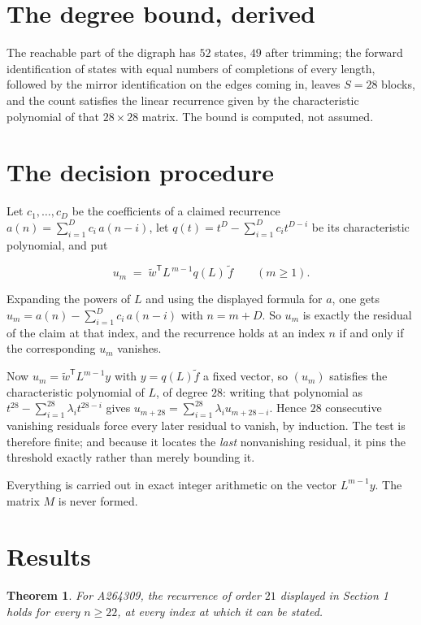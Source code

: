 \documentclass[11pt]{article}
\newtheorem{theorem}{Theorem}
\theoremstyle{definition}
\begin{document}
\section{The degree bound, derived}

The reachable part of the digraph has $52$ states, $49$ after trimming; the forward identification of states with equal numbers of completions of every length, followed by the mirror identification on the edges coming in, leaves $S = 28$ blocks, and the count satisfies the linear recurrence given by the characteristic polynomial of that $28\times28$ matrix. The bound is computed, not assumed.

\section{The decision procedure}

Let $c_1,\dots,c_D$ be the coefficients of a claimed recurrence $a(n) = \sum_{i=1}^{D} c_i\,a(n-i)$, let $q(t) = t^{D} - \sum_{i=1}^{D} c_i t^{D-i}$ be its characteristic polynomial, and put

\[u_m \;=\; \tilde w^{\mathsf T} L^{\,m-1} q(L)\,\tilde f \qquad (m \ge 1).\]

Expanding the powers of $L$ and using the displayed formula for $a$, one gets $u_m = a(n) - \sum_{i=1}^{D} c_i\,a(n-i)$ with $n = m + D$. So $u_m$ is exactly the residual of the claim at that index, and the recurrence holds at an index $n$ if and only if the corresponding $u_m$ vanishes.

Now $u_m = \tilde w^{\mathsf T} L^{m-1} y$ with $y = q(L)\tilde f$ a fixed vector, so $(u_m)$ satisfies the characteristic polynomial of $L$, of degree $28$: writing that polynomial as $t^{28} - \sum_{i=1}^{28} \lambda_i t^{28-i}$ gives $u_{m+28} = \sum_{i=1}^{28} \lambda_i u_{m+28-i}$. Hence $28$ consecutive vanishing residuals force every later residual to vanish, by induction. The test is therefore finite; and because it locates the {\itshape last} nonvanishing residual, it pins the threshold exactly rather than merely bounding it.

Everything is carried out in exact integer arithmetic on the vector $L^{m-1}y$. The matrix $M$ is never formed.

\section{Results}

\begin{theorem} For A264309, the recurrence of order $21$ displayed in Section 1 holds for every $n \ge 22$, at every index at which it can be stated.\end{theorem}
\end{document}
